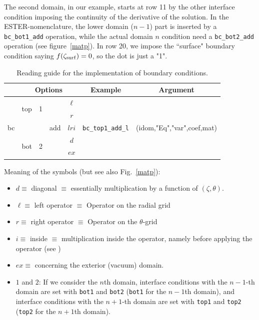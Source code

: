 The second domain, in our example, starts at row 11 by the other
interface condition imposing the continuity of the derivative of the
solution. In the ESTER-nomenclature, the lower domain ($n-1$) part is
inserted by a {\tt bc\_bot1\_add} operation, while the actual domain $n$
condition need a {\tt bc\_bot2\_add} operation (see figure~\ref{matp}). In
row 20, we impose the ``surface" boundary condition saying $f(\zeta_{\rm
surf})=0$, so the dot is just a "1".

\begin{table}
\begin{tabular}{|c|c|c|c|c|c|c|}
\hline
 &\multicolumn{4}{c|}{Options} & Example & Argument \\
\hline
\multirow{5}{1cm}{bc} & \multirow{2}{1cm}{top} & \multirow{2}{1cm}{1} &
\multirow{5}{1cm}{add} & $\ell$ & \multirow{5}{2.5cm}{\tt bc\_top1\_add\_l}
 & \multirow{5}{4.5cm}{(idom,"Eq","var",coef,mat)} \\
      &     &   &         &  $r$   &  & \\
      &     &   &         &  $lri$   &  & \\
      & \multirow{2}{1cm}{bot} & \multirow{2}{1cm}{2}   &         &  $d$   &  & \\
      &     &   &         &  $ex$   &  & \\
\hline
\end{tabular}
\caption[]{Reading guide for the implementation of boundary conditions.}
\end{table}

Meaning of the symbols (but see also Fig.~\ref{matp}):
\begin{itemize}
\item $d\equiv$ diagonal $\equiv$ essentially multiplication by a
function of $(\zeta,\theta)$.
\item $\ell\equiv$ left operator $\equiv$ Operator on the radial grid
\item $r\equiv$ right operator $\equiv$ Operator on the $\theta$-grid
\item $i\equiv$ inside $\equiv$ multiplication inside the operator, namely before
applying the operator (see )
\item $ex\equiv$ concerning the exterior (vacuum) domain.

\item $1$ and $2$: If we consider the $n$th domain, interface conditions with the $n-1$-th
domain are set with {\tt bot1} and {\tt bot2} ({\tt bot1} for the $n-1$th domain), and interface
conditions with the $n+1$-th domain are set with {\tt top1} and {\tt top2} ({\tt top2} for the
$n+1$th domain).
\end{itemize}

